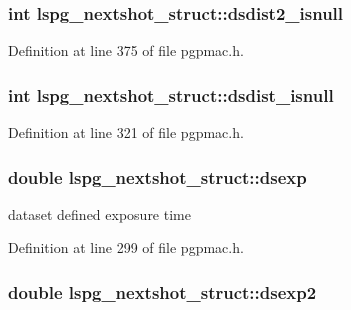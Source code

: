 \hypertarget{structlspg__nextshot__struct_a7fce65f4719a4a8110006f8b72eec3f7}{
\subsubsection[{dsdist2\-\_\-isnull}]{\setlength{\rightskip}{0pt plus 5cm}int lspg\-\_\-nextshot\-\_\-struct\-::dsdist2\-\_\-isnull}}\label{structlspg__nextshot__struct_a7fce65f4719a4a8110006f8b72eec3f7}


Definition at line 375 of file pgpmac.\-h.

\hypertarget{structlspg__nextshot__struct_ac6f2bdc7b023d933509bf74af7b169f9}{
\subsubsection[{dsdist\-\_\-isnull}]{\setlength{\rightskip}{0pt plus 5cm}int lspg\-\_\-nextshot\-\_\-struct\-::dsdist\-\_\-isnull}}\label{structlspg__nextshot__struct_ac6f2bdc7b023d933509bf74af7b169f9}


Definition at line 321 of file pgpmac.\-h.

\hypertarget{structlspg__nextshot__struct_a063e4c99201a763c2eb048acfc855efa}{
\subsubsection[{dsexp}]{\setlength{\rightskip}{0pt plus 5cm}double lspg\-\_\-nextshot\-\_\-struct\-::dsexp}}\label{structlspg__nextshot__struct_a063e4c99201a763c2eb048acfc855efa}


dataset defined exposure time 



Definition at line 299 of file pgpmac.\-h.

\hypertarget{structlspg__nextshot__struct_a4d8c34309572875352ddabe9cc9001ee}{
\subsubsection[{dsexp2}]{\setlength{\rightskip}{0pt plus 5cm}double lspg\-\_\-nextshot\-\_\-struct\-::dsexp2}}\label{structlspg__nextshot__struct_a4d8c34309572875352ddabe9cc9001ee}


